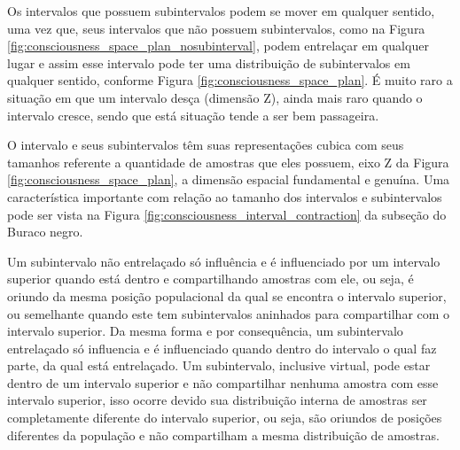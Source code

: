 Os intervalos que possuem subintervalos podem se mover em qualquer sentido, uma vez que, seus intervalos que não possuem subintervalos, como na Figura \ref{fig:consciousness_space_plan_nosubinterval}, podem entrelaçar em qualquer lugar e assim esse intervalo pode ter uma distribuição de subintervalos em qualquer sentido, conforme Figura \ref{fig:consciousness_space_plan}. É muito raro a situação em que um intervalo desça (dimensão Z), ainda mais raro quando o intervalo cresce, sendo que está situação tende a ser bem passageira.

O intervalo e seus subintervalos têm suas representações cubica com seus tamanhos referente a quantidade de amostras que eles possuem, eixo Z da Figura \ref{fig:consciousness_space_plan}, a dimensão espacial fundamental e genuína. Uma característica importante com relação ao tamanho dos intervalos e subintervalos pode ser vista na Figura \ref{fig:consciousness_interval_contraction} da subseção do Buraco negro.

Um subintervalo não entrelaçado só influência e é influenciado por um intervalo superior quando está dentro e compartilhando amostras com ele, ou seja, é oriundo da mesma posição populacional da qual se encontra o intervalo superior, ou semelhante quando este tem subintervalos aninhados para compartilhar com o intervalo superior. Da mesma forma e por consequência, um subintervalo entrelaçado só influencia e é influenciado quando dentro do intervalo o qual faz parte, da qual está entrelaçado. Um subintervalo, inclusive virtual, pode estar dentro de um intervalo superior e não compartilhar nenhuma amostra com esse intervalo superior, isso ocorre devido sua distribuição interna de amostras ser completamente diferente do intervalo superior, ou seja, são oriundos de posições diferentes da população e não compartilham a mesma distribuição de amostras.

